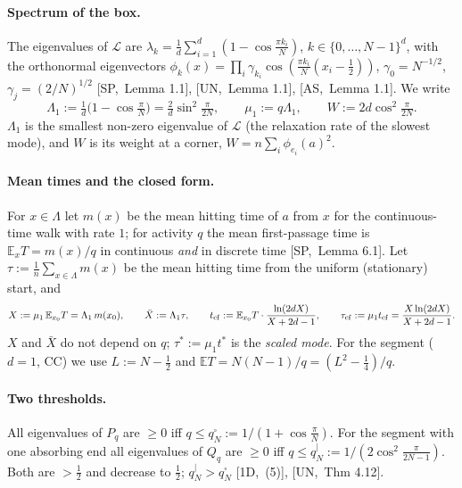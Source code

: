 \documentclass[10pt,a4paper]{article}
\theoremstyle{plain}
\theoremstyle{definition}
\newcommand{\src}[2]{[\textsf{#1},~#2]}           %
\newcommand{\ONE}{\textsf{1D}}
\newcommand{\SPE}{\textsf{SP}}
\newcommand{\ASY}{\textsf{AS}}
\newcommand{\UNI}{\textsf{UN}}
\newcommand{\E}{\mathbb{E}}
\newcommand{\Lg}{\mathcal{L}}
\newcommand{\Xb}{\bar X}
\newcommand{\qbox}{q^{\square}_N}
\newcommand{\qseg}{q^{|}_N}
\begin{document}
\paragraph{Spectrum of the box.} The eigenvalues of $\Lg$ are $\lambda_k=\frac1d\sum_{i=1}^d(1-\cos\frac{\pi k_i}N)$, $k\in\{0,\dots,N-1\}^d$, with the orthonormal eigenvectors $\phi_k(x)=\prod_i\gamma_{k_i}\cos(\frac{\pi k_i}N(x_i-\frac12))$, $\gamma_0=N^{-1/2}$, $\gamma_j=(2/N)^{1/2}$ \src{\SPE}{Lemma 1.1}, \src{\UNI}{Lemma 1.1}, \src{\ASY}{Lemma 1.1}. We write
\[
\Lambda_1:=\tfrac1d\bigl(1-\cos\tfrac\pi N\bigr)=\tfrac2d\sin^2\tfrac{\pi}{2N},\qquad \mu_1:=q\Lambda_1,\qquad W:=2d\cos^2\tfrac{\pi}{2N}.
\]
$\Lambda_1$ is the smallest non-zero eigenvalue of $\Lg$ (the relaxation rate of the slowest mode), and $W$ is its weight at a corner, $W=n\sum_i\phi_{e_i}(a)^2$.

\paragraph{Mean times and the closed form.} For $x\in\Lambda$ let $m(x)$ be the mean hitting time of $a$ from $x$ for the continuous-time walk with rate $1$; for activity $q$ the mean first-passage time is $\E_xT=m(x)/q$ in continuous \emph{and} in discrete time \src{\SPE}{Lemma 6.1}. Let $\tau:=\frac1n\sum_{x\in\Lambda}m(x)$ be the mean hitting time from the uniform (stationary) start, and
\[
X:=\mu_1\,\E_{x_0}T=\Lambda_1\,m(x_0),\qquad \Xb:=\Lambda_1\tau,\qquad t_{\rm cf}:=\E_{x_0}T\cdot\frac{\ln(2dX)}{X+2d-1},\qquad \tau_{\rm cf}:=\mu_1t_{\rm cf}=\frac{X\ln(2dX)}{X+2d-1}.
\]
$X$ and $\Xb$ do not depend on $q$; $\tau^*:=\mu_1t^*$ is the \emph{scaled mode}. For the segment ($d=1$, CC) we use $L:=N-\frac12$ and $\E T=N(N-1)/q=(L^2-\frac14)/q$.

\paragraph{Two thresholds.} All eigenvalues of $P_q$ are $\ge0$ iff $q\le\qbox:=1/(1+\cos\frac\pi N)$. For the segment with one absorbing end all eigenvalues of $Q_q$ are $\ge0$ iff $q\le\qseg:=1/(2\cos^2\frac{\pi}{2N-1})$. Both are $>\frac12$ and decrease to $\frac12$; $\qseg>\qbox$ \src{\ONE}{(5)}, \src{\UNI}{Thm 4.12}.
\end{document}
